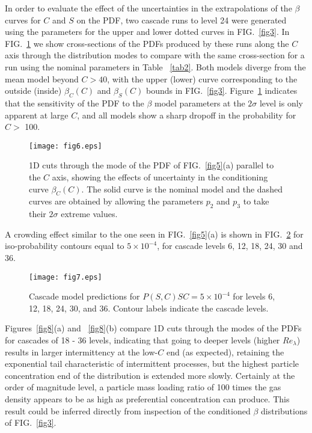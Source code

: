 \documentclass[aps,pra,twocolumn,groupedaddress,showkeys,showpacs,floatfix]{revtex4}
\begin{document}
In order to evaluate the effect of the uncertainties in the extrapolations of
the $\beta$ curves for $C$ and $S$ on the PDF, two cascade runs to level 24
were generated using the parameters for the upper and lower dotted curves in FIG.~\ref{fig3}. 
In FIG.~\ref{fig6} we show cross-sections of the PDFs produced by these runs
along the $C$ axis through the distribution modes to compare with the same
cross-section for a run using the nominal parameters in Table ~\ref{tab2}. 
Both models
diverge from the mean model beyond $C > 40$, with the upper (lower) curve
corresponding to the outside (inside) $\beta_C(C)$ and $\beta_S(C)$ bounds in
FIG.~\ref{fig3}. Figure~\ref{fig6} indicates that the sensitivity of the PDF to the $\beta$
model parameters at the $2\sigma$ level is only apparent at large $C$, and all
models show a sharp dropoff in the probability for $C >$ 100.



\begin{figure}[h]
\begin{center}
\texttt{[image: fig6.eps]}
\caption{\label{fig6}1D cuts through 
the mode of the PDF of FIG.~\ref{fig5}(a) parallel to the $C$ axis, showing the effects 
of uncertainty in the conditioning curve $\beta_C(C)$. The solid curve is the 
nominal model and the dashed curves are obtained by allowing the parameters
$p_2$ and $p_3$ to take their $2\sigma$ extreme values.}
\end{center}
\end{figure}


A crowding effect similar to the one seen in FIG.~\ref{fig5}(a) is shown in FIG.~\ref{fig7} for
iso-probability contours equal to $5 \times 10^{-4}$, for cascade levels 6, 12,
18, 24, 30 and 36. 



\begin{figure}[h]
\begin{center}
\texttt{[image: fig7.eps]}
\caption{\label{fig7}Cascade model predictions for $P(S,C)SC = 5 \times 10^{-4}$ for levels
6, 12, 18, 24, 30, and 36. Contour labels indicate the cascade levels.}
\end{center}
\end{figure}

Figures~\ref{fig8}(a) and ~\ref{fig8}(b) compare 1D cuts through the modes of the PDFs for
cascades of 18 - 36 levels, indicating that going to deeper levels (higher
$Re_{\lambda}$) results in larger intermittency at the low-$C$ end (as expected), retaining
the exponential tail characteristic of intermittent processes, but the
highest particle concentration end of the distribution is extended more slowly. Certainly
at the order of magnitude level, a particle mass loading ratio of 100 times the
gas density appears to be as high as preferential concentration can produce.
This result could be inferred directly from inspection of the conditioned
$\beta$ distributions of FIG.~\ref{fig3}.
\end{document}
